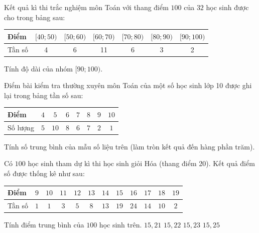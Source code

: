 \begin{ex}%
	Kết quả  kì thi trắc nghiệm môn Toán với thang điểm $100$ của $32$ học sinh được cho trong bảng sau:
	\begin{center}
		\begin{tabular}{|l|c|c|c|c|c|c|}
			\hline Điểm & $[40; 50) $ & $[50; 60) $ & $[60; 70) $ & $[70; 80) $ & $[80;  90) $ & $[90; 100) $ \\
			\hline Tần số & 4 & 6 & 11 & 6 & 3 & 2  \\
			 \hline
		\end{tabular}
	\end{center}
	 Tính độ dài của nhóm $[90;100)$.
	 \loigiai{
		Độ dài của nhóm  $[90;100)$ là $100-90=10$.
	 }
\end{ex}

\begin{bt}%
	Điểm bài kiểm tra thường xuyên môn Toán của một số học sinh lớp 10 được ghi lại trong bảng tần số sau:
	\begin{center}
		\begin{tabular}{|l|c|c|c|c|c|c|c|}
			\hline
			Điểm & $4$ & $5$ & $6$ & $7$ & $8$ & $9$ & $10$ \\
			\hline
			Số lượng & $5$ & $10$ & $8$ & $6$ & $7$ & $2$ & $1$ \\
			\hline
		\end{tabular}
	\end{center}
	Tính số trung bình của mẫu số liệu trên (làm tròn kết quả đến hàng phần trăm).
\end{bt}

\begin{ex}%
	Có $100$ học sinh tham dự kì thi học sinh giỏi Hóa (thang điểm 20). Kết quả điểm số được thống kê như sau:
	\begin{center}
		\begin{tabular}{|l|c|c|c|c|c|c|c|c|c|c|c|}
			\hline
			Điểm & $9$ & $10$ & $11$ & $12$ & $13$ & $14$ & $15$ & $16$ & $17$ & $18$ & $19$ \\
			\hline
			Tần số & $1$ & $1$ & $3$ & $5$ & $8$ & $13$ & $19$ & $24$ & $14$ & $10$ & $2$ \\
			\hline
		\end{tabular}
	\end{center}
	Tính điểm trung bình của $100$ học sinh trên.
	\choice
	{$15,21$}
	{$15,22$}
	{$15,23$}
	{\True $15,25$}
\end{ex}


